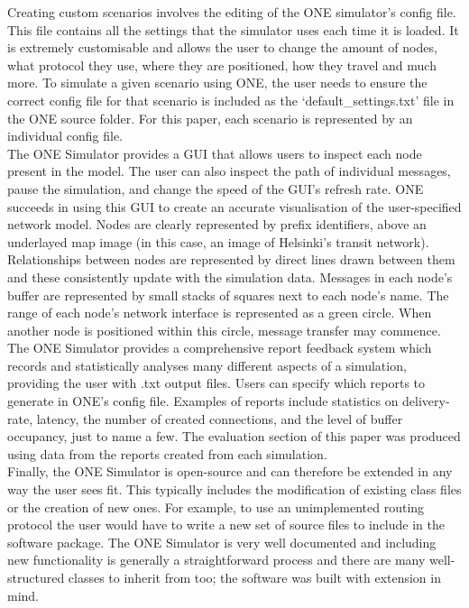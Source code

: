 \documentclass{article}
\begin{document}
\newline Creating custom scenarios involves the editing of the ONE simulator's config file. This file contains all the settings that the simulator uses each time it is loaded. It is extremely customisable and allows the user to change the amount of nodes, what protocol they use, where they are positioned, how they travel and much more. To simulate a given scenario using ONE, the user needs to ensure the correct config file for that scenario is included as the `default\_settings.txt' file in the ONE source folder. For this paper, each scenario is represented by an individual config file.\\
\newline The ONE Simulator provides a GUI that allows users to inspect each node present in the model. The user can also inspect the path of individual messages, pause the simulation, and change the speed of the GUI's refresh rate. ONE succeeds in using this GUI to create an accurate visualisation of the user-specified network model. Nodes are clearly represented by prefix identifiers, above an underlayed map image (in this case, an image of Helsinki's transit network). Relationships between nodes are represented by direct lines drawn between them and these consistently update with the simulation data. Messages in each node's buffer are represented by small stacks of squares next to each node's name. The range of each node's network interface is represented as a green circle. When another node is positioned within this circle, message transfer may commence.\\
\newline The ONE Simulator provides a comprehensive report feedback system which records and statistically analyses many different aspects of a simulation, providing the user with .txt output files. Users can specify which reports to generate in ONE's config file. Examples of reports include statistics on delivery-rate, latency, the number of created connections, and the level of buffer occupancy, just to name a few. The evaluation section of this paper was produced using data from the reports created from each simulation.\\
\newline Finally, the ONE Simulator is open-source and can therefore be extended in any way the user sees fit. This typically includes the modification of existing class files or the creation of new ones. For example, to use an unimplemented routing protocol the user would have to write a new set of source files to include in the software package. The ONE Simulator is very well documented and including new functionality is generally a straightforward process and there are many well-structured classes to inherit from too; the software was built with extension in mind.\\
\end{document}
